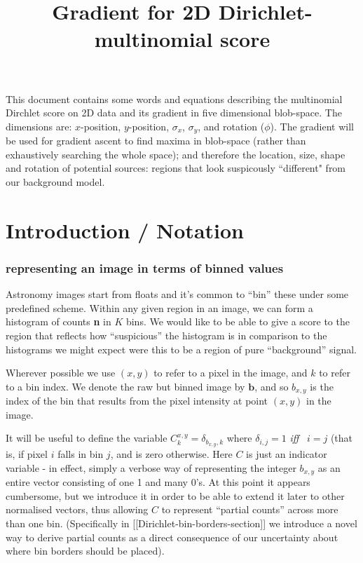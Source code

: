 \documentclass{report}
\title{Gradient for 2D Dirichlet-multinomial score}
\begin{document}
\maketitle

This document contains some words and equations describing the multinomial Dirchlet score on 2D data and its gradient in five dimensional blob-space. The dimensions are: $x$-position, $y$-position, $\sigma_x$, $\sigma_y$, and rotation ($\phi$). The gradient will be used for gradient ascent to find maxima in blob-space (rather than exhaustively searching the whole space); and therefore the location, size, shape and rotation of potential sources: regions that look suspicously ``different" from our background model.

\section{Introduction / Notation}


\subsubsection{representing an image in terms of binned values}

Astronomy images start from floats and it's common to ``bin'' these
under some predefined scheme. Within any given region in an image, we
can form a histogram of counts \textbf{n} in $K$ bins. We would like
to be able to give a score to the region that reflects how
``suspicious'' the histogram is in comparison to the histograms we
might expect were this to be a region of pure ``background'' signal.

Wherever possible we use $(x,y)$ to refer to a pixel in the image, and $k$
to refer to a bin index.  We denote the raw but binned image by
$\mathbf{b}$, and so $b_{x,y}$ is the index of the bin that results from
the pixel intensity at point $(x,y)$ in the image.

It will be useful to define the variable $C^{x,y}_k =\delta_{b_{x,y},k}$ where
$\delta_{i,j}=1$ {\it iff} \, $i=j$ (that is, if pixel $i$ falls in bin $j$, and is zero otherwise. Here $C$
is just an indicator variable - in effect, simply a verbose way of
representing the integer $b_{x,y}$ as an entire vector consisting of one 1
and many 0's. At this point it appears cumbersome, but we introduce it
in order to be able to extend it later to other normalised vectors,
thus allowing $C$ to represent ``partial counts'' across more than one
bin.  (Specifically in [[Dirichlet-bin-borders-section]] we introduce
a novel way to derive partial counts as a direct consequence of our
uncertainty about where bin borders should be placed).
\end{document}
